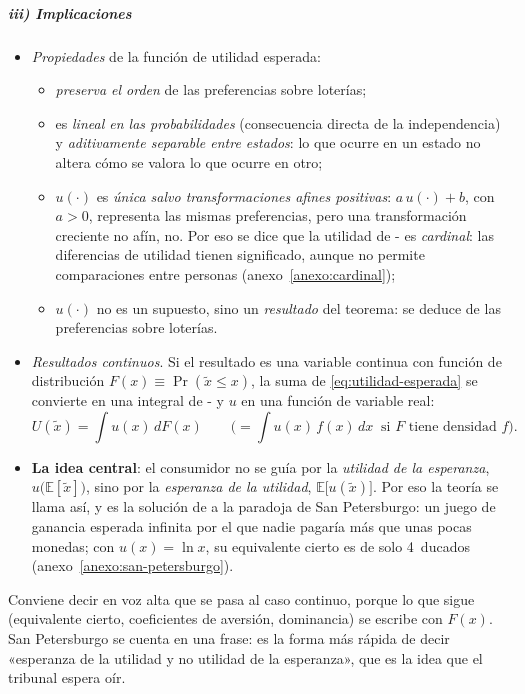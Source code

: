 \documentclass[11pt]{article}
\begin{document}
\subparagraph{iii) Implicaciones}

\begin{itemize}
\item \emph{Propiedades} de la función de utilidad esperada:
  \begin{itemize}
  \item \emph{preserva el orden} de las preferencias sobre loterías;
  \item es \emph{lineal en las probabilidades} (consecuencia directa de la independencia) y \emph{aditivamente separable entre estados}: lo que ocurre en un estado no altera cómo se valora lo que ocurre en otro;
  \item $u(\cdot)$ es \emph{única salvo transformaciones afines positivas}: $a\,u(\cdot)+b$, con $a>0$, representa las mismas preferencias, pero una transformación creciente no afín, no. Por eso se dice que la utilidad de - es \emph{cardinal}: las diferencias de utilidad tienen significado, aunque no permite comparaciones entre personas (anexo~\ref{anexo:cardinal});
  \item $u(\cdot)$ no es un supuesto, sino un \emph{resultado} del teorema: se deduce de las preferencias sobre loterías.
  \end{itemize}
\item \emph{Resultados continuos}. Si el resultado es una variable continua con función de distribución $F(x)\equiv\Pr(\tilde{x}\leq x)$, la suma de \eqref{eq:utilidad-esperada} se convierte en una integral de - y $u$ en una función de variable real:
  $$U(\tilde{x})=\int u(x)\,dF(x)\qquad\Big(=\int u(x)\,f(x)\,dx\ \text{ si } F \text{ tiene densidad } f\Big).$$
\item \textbf{La idea central}: el consumidor no se guía por la \emph{utilidad de la esperanza}, $u\big(\mathbb{E}[\tilde{x}]\big)$, sino por la \emph{esperanza de la utilidad}, $\mathbb{E}\big[u(\tilde{x})\big]$. Por eso la teoría se llama así, y es la solución de \textcite{Bernoulli1738Specimen} a la paradoja de San Petersburgo: un juego de ganancia esperada infinita por el que nadie pagaría más que unas pocas monedas; con $u(x)=\ln x$, su equivalente cierto es de solo 4~ducados (anexo~\ref{anexo:san-petersburgo}).
\end{itemize}

\begin{notaopositor}
Conviene decir en voz alta que se pasa al caso continuo, porque lo que sigue (equivalente cierto, coeficientes de aversión, dominancia) se escribe con $F(x)$. San Petersburgo se cuenta en una frase: es la forma más rápida de decir «esperanza de la utilidad y no utilidad de la esperanza», que es la idea que el tribunal espera oír.
\end{notaopositor}
\end{document}
